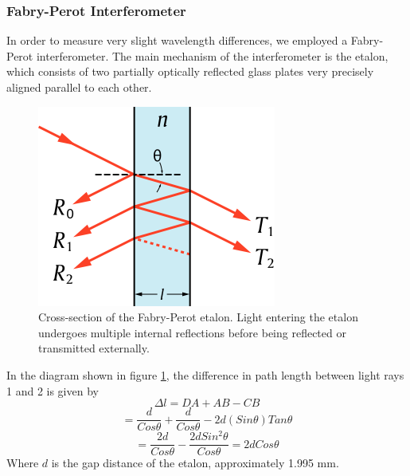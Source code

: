 \documentclass[twocolumn]{article}
\begin{document}
			\subsubsection{Fabry-Perot Interferometer}
				In order to measure very slight wavelength differences, we employed a Fabry-Perot interferometer.
				The main mechanism of the interferometer is the etalon, which consists of two partially optically reflected glass plates very precisely aligned parallel to each other.
				
				\begin{figure}
					\centering
					\includegraphics[width=0.95\linewidth]{Images/EtalonDiagram}
					\caption{Cross-section of the Fabry-Perot etalon. Light entering the etalon undergoes multiple internal reflections before being reflected or transmitted externally.}
					\label{fig:Fabry-Perot}
				\end{figure}
				
				In the diagram shown in figure \ref{fig:Fabry-Perot}, the difference in path length between light rays 1 and 2 is given by
				\begin{equation}
					\Delta l = DA + AB - CB 
				\end{equation}
				\begin{equation}
					= \frac{d}{Cos\theta} + \frac{d}{Cos\theta} - 2d(Sin\theta)Tan\theta
				\end{equation}
				\begin{equation}
					= \frac{2d}{Cos\theta} - \frac{2dSin^2\theta}{Cos\theta} =2dCos\theta
				\end{equation}
				Where $d$ is the gap distance of the etalon, approximately 1.995 mm.
				
\end{document}
